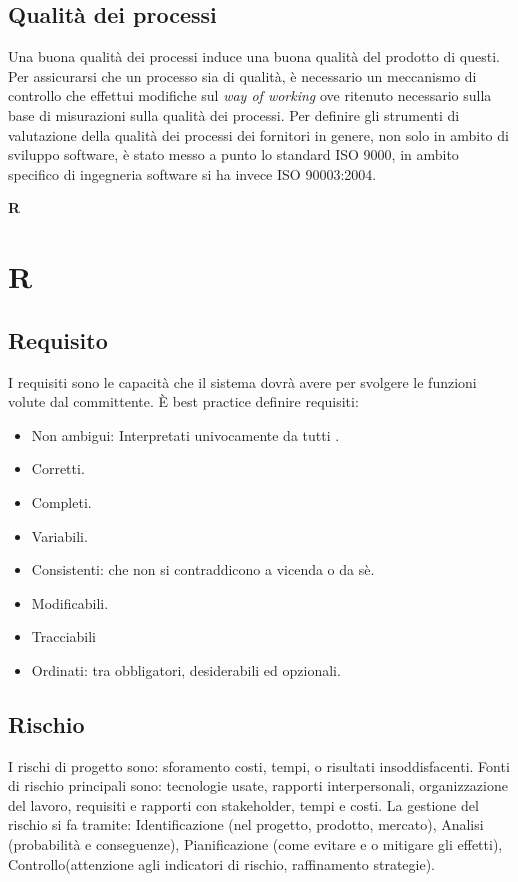 	\subsection{Qualità dei processi}
	Una buona qualità dei processi induce una buona qualità del prodotto di questi. Per assicurarsi che un processo sia di qualità, è necessario un meccanismo di controllo che effettui modifiche sul \emph{way of working} ove ritenuto necessario sulla base di misurazioni sulla qualità dei processi. Per definire gli strumenti di valutazione della qualità dei processi dei fornitori in genere, non solo in ambito di sviluppo software, è stato messo a punto lo standard ISO 9000, in ambito specifico di ingegneria software si ha invece ISO 90003:2004.
	
		\newpage

	{\Huge{\textbf{R}}} \\
	\section{R}

	\subsection{Requisito}
	\label{sec:requisito}
	I requisiti sono le capacità che il sistema dovrà avere per svolgere le funzioni volute dal committente. È best practice definire requisiti:
	\begin{itemize}  
	\item Non ambigui: Interpretati univocamente da tutti .
	\item Corretti.
	\item Completi.
	\item Variabili.
	\item Consistenti: che non si contraddicono a vicenda o da sè.
	\item Modificabili.
	\item Tracciabili
	\item Ordinati: tra obbligatori, desiderabili ed opzionali. 
	\end{itemize}

	\subsection{Rischio}
	\label{sec:rischio}
	I rischi di progetto sono: sforamento costi, tempi, o risultati insoddisfacenti. Fonti di rischio principali sono:
	tecnologie usate, rapporti interpersonali, organizzazione del lavoro, requisiti e rapporti con stakeholder, tempi e costi.
	La gestione del rischio si fa tramite:
	Identificazione (nel progetto, prodotto, mercato), Analisi (probabilità e conseguenze), Pianificazione (come evitare e o mitigare gli effetti), Controllo(attenzione agli indicatori di rischio, raffinamento strategie).
	
